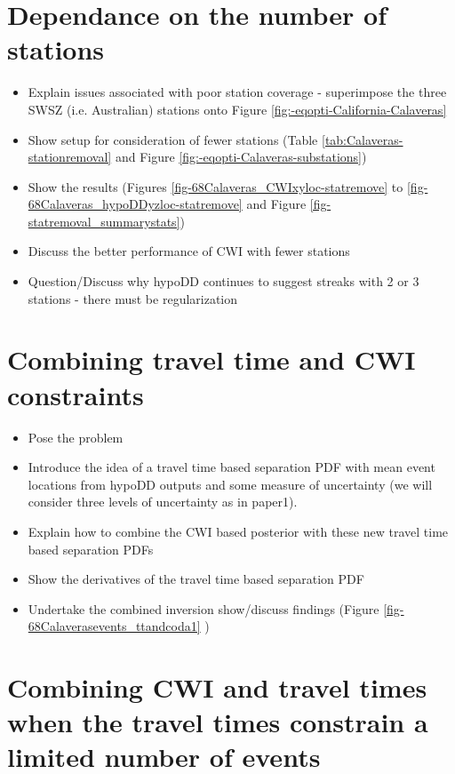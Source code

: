 \documentclass[draft,jgrga]{agutex}
\begin{document}
\begin{article}
\section{Dependance on the number of stations}

\begin{itemize}
\item Explain issues associated with poor station coverage - superimpose
the three SWSZ (i.e. Australian) stations onto  Figure
\ref{fig:-eqopti-California-Calaveras}
\item Show setup for consideration of fewer stations (Table
\ref{tab:Calaveras-stationremoval}
and Figure \ref{fig:-eqopti-Calaveras-substations})
\item Show the results (Figures \ref{fig-68Calaveras_CWIxyloc-statremove}
to \ref{fig-68Calaveras_hypoDDyzloc-statremove} and Figure \ref{fig-statremoval_summarystats})
\item Discuss the better performance of CWI with fewer stations
\item Question/Discuss why hypoDD continues to suggest streaks with 2 or 3 stations - there must be regularization
\end{itemize}

\section{Combining travel time and CWI constraints}

\begin{itemize}
\item Pose the problem
\item Introduce the idea of a travel time based separation PDF with mean event locations from hypoDD outputs and
some measure of uncertainty (we will consider three levels of uncertainty as in paper1).
\item Explain how to combine the CWI based posterior with these new travel time based separation PDFs
\item Show the derivatives of the travel time based separation PDF
\item Undertake the combined inversion show/discuss findings (Figure \ref{fig-68Calaverasevents_ttandcoda1} )
\end{itemize}


\section{Combining CWI and travel times when the travel times constrain a limited number of events}


\end{article}
\end{document}
